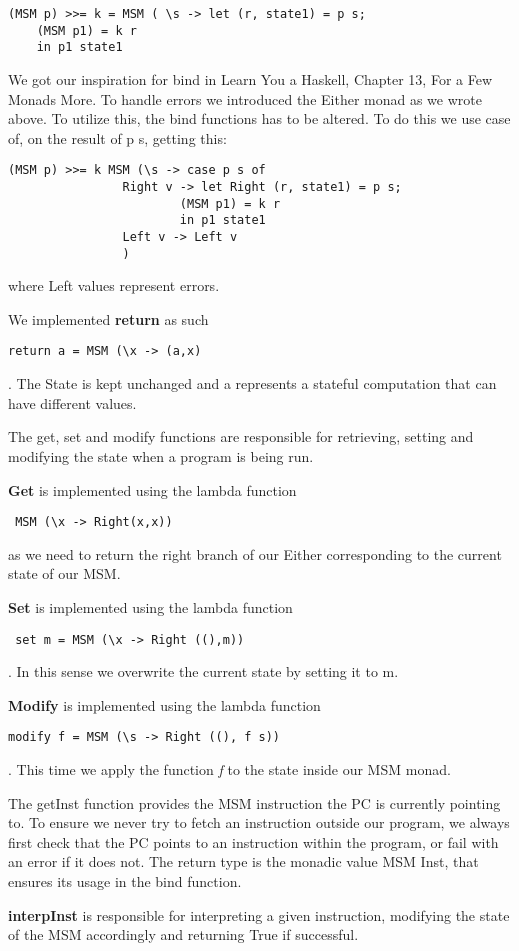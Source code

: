\documentclass[]{article}
\begin{document}
\begin{verbatim}(MSM p) >>= k = MSM ( \s -> let (r, state1) = p s;
	(MSM p1) = k r
	in p1 state1
\end{verbatim}
We got our inspiration for bind in Learn You a Haskell, Chapter 13, For a Few Monads More.
To handle errors we introduced the Either monad as we wrote above. To utilize this, the bind functions has to be altered. To do this we use case of, on the result of p s,  getting this:
\begin{verbatim}
(MSM p) >>= k MSM (\s -> case p s of
				Right v -> let Right (r, state1) = p s;
						(MSM p1) = k r
						in p1 state1
				Left v -> Left v
				)
\end{verbatim}
where Left values represent errors.\par
We implemented \textbf{return} as such \begin{verbatim}return a = MSM (\x -> (a,x)\end{verbatim}. The State is kept unchanged and a represents a stateful computation that can have different values. \par
The get, set and modify functions are responsible for retrieving, setting and modifying the state when a program is being run.\par
\textbf{Get} is implemented using the lambda function\begin{verbatim} MSM (\x -> Right(x,x)) \end{verbatim}as we need to return the right branch of our Either corresponding to the current state of our MSM.\par
\textbf{Set} is implemented using the lambda function\begin{verbatim} set m = MSM (\x -> Right ((),m))\end{verbatim}. In this sense we overwrite the current state by setting it to m.\par
\textbf{Modify} is implemented using the lambda function \begin{verbatim}modify f = MSM (\s -> Right ((), f s))\end{verbatim}. This time we apply the function \emph{f} to the state inside our MSM monad. \par
The getInst function provides the MSM instruction the PC is currently pointing to. To ensure we never try to fetch an instruction outside our program, we always first check that the PC points to an instruction within the program, or fail with an error if it does not. The return type is the monadic value MSM Inst, that ensures its usage in the bind function.\par
\textbf{interpInst} is responsible for interpreting a given instruction, modifying the state of the MSM accordingly and returning True if successful.\par
\end{document}
